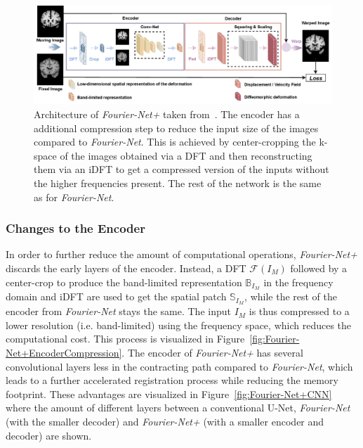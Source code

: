 \begin{figure}[h] %
	\centering
	\graphicspath{{images/}{\main/images/}}
	\includegraphics[width=\linewidth]{ArchitectureFourier-Net+.png} 
	\caption{Architecture of \emph{Fourier-Net+} taken from~\cite{Fourier-Net+}. The encoder has a additional compression step to reduce the input size of the images compared to \emph{Fourier-Net}. This is achieved by center-cropping the k-space of the images obtained via a DFT and then reconstructing them via an iDFT to get a compressed version of the inputs without the higher frequencies present. The rest of the network is the same as for \emph{Fourier-Net}.}
	\label{fig:Fourier-Net+}
\end{figure}

\subsubsection{Changes to the Encoder} \label{SubSubSec:ChangesEncoder}
In order to further reduce the amount of computational operations, \emph{Fourier-Net+} discards the early layers of the encoder. Instead, a DFT $\mathcal{F}(I_M)$ followed by a center-crop to produce the band-limited representation $\mathbb{B}_{I_M}$ in the frequency domain and iDFT are used to get the spatial patch $\mathbb{S}_{I_M}$, while the rest of the encoder from \emph{Fourier-Net} stays the same. The input $I_M$ is thus compressed to a lower resolution (i.e. band-limited) using the frequency space, which reduces the computational cost. This process is visualized in Figure~\ref{fig:Fourier-Net+EncoderCompression}. The encoder of \emph{Fourier-Net+} has several convolutional layers less in the contracting path compared to \emph{Fourier-Net}, which leads to a further accelerated registration process while reducing the memory footprint. These advantages are visualized in Figure~\ref{fig:Fourier-Net+CNN} where the amount of different layers between a conventional U-Net, \emph{Fourier-Net} (with the smaller decoder) and \emph{Fourier-Net+} (with a smaller encoder and decoder) are shown.

